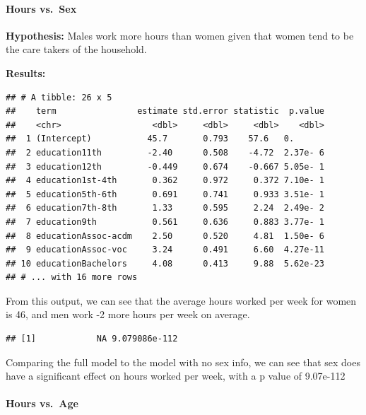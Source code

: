 \documentclass[]{article}
\newenvironment{Shaded}{\begin{snugshade}}{\end{snugshade}}
\newcommand{\KeywordTok}[1]{\textcolor[rgb]{0.13,0.29,0.53}{\textbf{#1}}}
\newcommand{\NormalTok}[1]{#1}
\newcommand{\OperatorTok}[1]{\textcolor[rgb]{0.81,0.36,0.00}{\textbf{#1}}}
\let\oldparagraph\paragraph
\renewcommand{\paragraph}[1]{\oldparagraph{#1}\mbox{}}
\begin{document}
\hypertarget{hours-vs.-sex}{%
\paragraph{Hours vs.~Sex}\label{hours-vs.-sex}}

\textbf{Hypothesis:} Males work more hours than women given that women
tend to be the care takers of the household.

\textbf{Results:}

\begin{verbatim}
## # A tibble: 26 x 5
##    term                estimate std.error statistic  p.value
##    <chr>                  <dbl>     <dbl>     <dbl>    <dbl>
##  1 (Intercept)           45.7       0.793    57.6   0.      
##  2 education11th         -2.40      0.508    -4.72  2.37e- 6
##  3 education12th         -0.449     0.674    -0.667 5.05e- 1
##  4 education1st-4th       0.362     0.972     0.372 7.10e- 1
##  5 education5th-6th       0.691     0.741     0.933 3.51e- 1
##  6 education7th-8th       1.33      0.595     2.24  2.49e- 2
##  7 education9th           0.561     0.636     0.883 3.77e- 1
##  8 educationAssoc-acdm    2.50      0.520     4.81  1.50e- 6
##  9 educationAssoc-voc     3.24      0.491     6.60  4.27e-11
## 10 educationBachelors     4.08      0.413     9.88  5.62e-23
## # ... with 16 more rows
\end{verbatim}

From this output, we can see that the average hours worked per week for
women is 46, and men work -2 more hours per week on average.

\begin{Shaded}
\end{Shaded}

\begin{verbatim}
## [1]            NA 9.079086e-112
\end{verbatim}

Comparing the full model to the model with no sex info, we can see that
sex does have a significant effect on hours worked per week, with a p
value of 9.07e-112

\hypertarget{hours-vs.-age}{%
\paragraph{Hours vs.~Age}\label{hours-vs.-age}}
\end{document}
